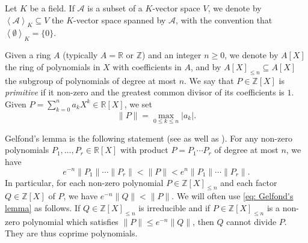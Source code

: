 \documentclass[10pt,a4paper]{amsart}
\numberwithin{equation}{section}
\newcommand\bR{\mathbb{R}}
\newcommand\bZ{\mathbb{Z}}
\newcommand\cA{\mathcal{A}}
\newcommand{\normH}[1]{\|#1\|}
\newcommand{\Vect}[2][]{\left\la #2\right\ra_{#1}}
\let\subset \subseteq
\let\la\langle
\let\ra\rangle
\theoremstyle{definition}
\theoremstyle{plain}
\begin{document}
Let $K$ be a field. If $\cA$ is a subset of a $K$-vector space $V$, we denote by $\Vect[K]{\cA} \subset V$ the $K$-vector space spanned by $\cA$, with the convention that $\Vect[K]{\emptyset} = \{0\}$.

Given a ring $A$ (typically $A=\bR$ or $\bZ$) and an integer $n\geq 0$, we denote by $A[X]$ the ring of polynomials in $X$ with coefficients in $A$, and by $A[X]_{\leq n} \subset A[X]$ the subgroup of polynomials of degree at most $n$. We say that $P\in\bZ[X]$ is \emph{primitive} if it non-zero and the greatest common divisor of its coefficients is $1$. Given $P=\sum_{k=0}^{n} a_kX^k \in \bR[X]$, we set
\begin{equation*}
\normH{P} = \max_{0\leq k \leq n} |a_k|.
\end{equation*}

Gelfond's lemma is the following statement (see \eg \cite[Lem.\,A.3]{bugeaud2004approximation} as well as \cite{brownawell1974sequences}). For any non-zero polynomials $P_1,\dots,P_r\in\bR[X]$ with product $P = P_1\cdots P_r$ of degree at most $n$, we have
\begin{equation}
\label{eq: Gelfond's lemma}
e^{-n} \normH{P_1}\cdots \normH{P_r} < \normH{P} < e^{n} \normH{P_1}\cdots \normH{P_r}.
\end{equation}
In particular, for each non-zero polynomial $P \in \bZ[X]_{\leq n}$ and each factor $Q\in\bZ[X]$ of $P$, we have $e^{-n}\normH{Q} < \normH{P}$. We will often use \eqref{eq: Gelfond's lemma} as follows. If $Q\in\bZ[X]_{\leq n}$ is irreducible and if $P\in\bZ[X]_{\leq n}$ is a non-zero polynomial which satisfies $\normH{P} \leq e^{-n}\normH{Q}$, then $Q$ cannot divide $P$. They are thus coprime polynomials.
\end{document}
